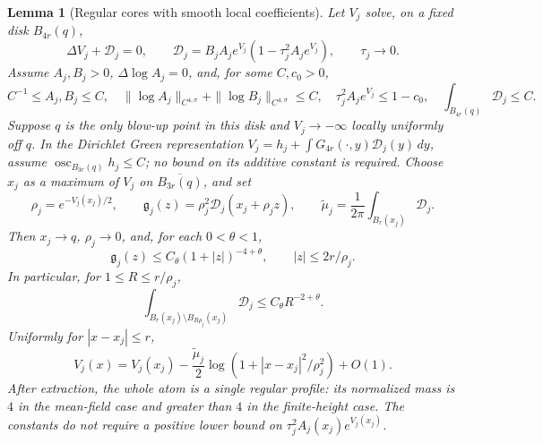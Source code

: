 \documentclass[11pt,reqno]{amsart}
\numberwithin{equation}{section}
\newtheorem{lemma}[theorem]{Lemma}
\theoremstyle{definition}
\theoremstyle{remark}
\DeclareMathOperator{\osc}{osc}
\begin{document}
\begin{lemma}[Regular cores with smooth local coefficients]
\label{lem:local-regular-core}
Let $V_j$ solve, on a fixed disk $B_{4r}(q)$,
\[
 \Delta V_j+\mathcal D_j=0,\qquad
 \mathcal D_j=B_jA_je^{V_j}(1-\tau_j^2A_je^{V_j}),\qquad \tau_j\to0.
\]
Assume $A_j,B_j>0$, $\Delta\log A_j=0$, and, for some $C,c_0>0$,
\[
 C^{-1}\le A_j,B_j\le C,\quad
 \|\log A_j\|_{C^{4,\sigma}}+\|\log B_j\|_{C^{4,\sigma}}\le C,
 \quad \tau_j^2A_je^{V_j}\le1-c_0,\quad
 \int_{B_{4r}(q)}\mathcal D_j\le C.
\]
Suppose $q$ is the only blow-up point in this disk and $V_j\to-\infty$
locally uniformly off $q$. In the Dirichlet Green representation
$V_j=h_j+\int G_{4r}(\cdot,y)\mathcal D_j(y)\,dy$, assume
$\osc_{B_{3r}(q)}h_j\le C$; no bound on its additive constant is required.
Choose $x_j$ as a maximum of $V_j$ on $\overline{B_{3r}(q)}$, and set
\[
 \rho_j=e^{-V_j(x_j)/2},\qquad
 \mathfrak g_j(z)=\rho_j^2\mathcal D_j(x_j+\rho_jz),\qquad
 \widetilde\mu_j=\frac1{2\pi}\int_{B_r(x_j)}\mathcal D_j.
\]
Then $x_j\to q$, $\rho_j\to0$, and, for each $0<\theta<1$,
\begin{equation}\label{eq:regular-core-decay}
 \mathfrak g_j(z)\le C_\theta(1+|z|)^{-4+\theta},
 \qquad |z|\le2r/\rho_j.
\end{equation}
In particular, for $1\le R\le r/\rho_j$,
\begin{equation}\label{eq:regular-core-exhaustion}
 \int_{B_r(x_j)\setminus B_{R\rho_j}(x_j)}\mathcal D_j
 \le C_\theta R^{-2+\theta}.
\end{equation}
Uniformly for $|x-x_j|\le r$,
\begin{equation}\label{eq:local-regular-log}
 V_j(x)=V_j(x_j)-\frac{\widetilde\mu_j}{2}
              \log(1+|x-x_j|^2/\rho_j^2)+O(1).
\end{equation}
After extraction, the whole atom is a single regular profile: its
normalized mass is $4$ in the mean-field case and greater than $4$
in the finite-height case. The constants do not require a positive
lower bound on $\tau_j^2A_j(x_j)e^{V_j(x_j)}$.
\end{lemma}
\end{document}
